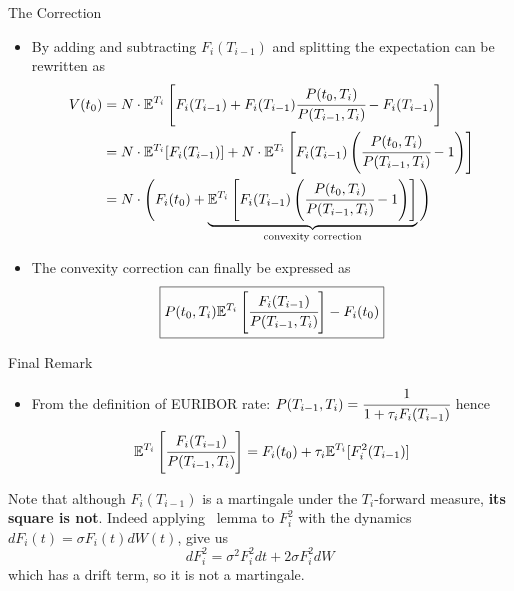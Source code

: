 \documentclass{beamer}
\begin{document}
\begin{frame}{The Correction}
	\begin{itemize}
		\item<1-> By adding and subtracting $F_i(T_{i-1})$ and splitting the expectation can be rewritten as
		\begin{equation*}
			\begin{aligned}
				V(t_0) &= N\cdot \mathbb{E}^{T_i}\left[F_i(T_{i-1}) + F_i(T_{i-1})\cfrac{P(t_0,T_i)}{P(T_{i-1}, T_i)} - F_i(T_{i-1})\right] \\
				&= N\cdot \mathbb{E}^{T_i}[F_i(T_{i-1})] + N\cdot \mathbb{E}^{T_i}\left[F_i(T_{i-1})\left(\cfrac{P(t_0,T_i)}{P(T_{i-1}, T_i)}-1\right)\right]\\
				&=N\cdot\Bigg(F_i(t_0) + \underbrace{\mathbb{E}^{T_i}\left[F_i(T_{i-1})\left(\cfrac{P(t_0,T_i)}{P(T_{i-1}, T_i)}-1\right)\right]}_{\text{convexity correction}}\Bigg)
			\end{aligned}
		\end{equation*}
		\item<2-> The convexity correction can finally be expressed as
		\begin{equation}
			\boxed{
				P(t_0,T_i)\mathbb{E}^{T_i}\left[\cfrac{F_i(T_{i-1})}{P(T_{i-1},T_i)}\right]-F_i(t_0)}
		\end{equation}
	\end{itemize}
\end{frame}

\begin{frame}{Final Remark}
	\begin{itemize}
		\item<1-> From the definition of EURIBOR rate: $P(T_{i-1},T_i)=\cfrac{1}{1+\tau_i F_i(T_{i-1})}$ hence
		\begin{equation*}
			\mathbb{E}^{T_i}\left[\cfrac{F_i(T_{i-1})}{P(T_{i-1},T_i)}\right]=F_i(t_0)+\tau_i\mathbb{E}^{T_i}[F_i^2(T_{i-1})]
		\end{equation*}
	\end{itemize}
	\vfill
	\begin{tcolorbox}[colback=gray!5, colframe=maincolor, arc=0mm, boxrule=0.5pt]
		\footnotesize
		Note that although $F_i(T_{i-1})$ is a martingale under the $T_i$-forward measure, \textbf{its square is not}.
		Indeed applying \ito~lemma to $F_i^2$ with the  dynamics $dF_i(t) = \sigma F_i(t)dW(t)$, give us
		\begin{equation*}
			dF_i^2=\sigma^2F_i^2dt+2\sigma F_i^2dW
		\end{equation*}
		which has a drift term, so it is not a martingale.
	\end{tcolorbox}
	
\end{frame}
\end{document}
